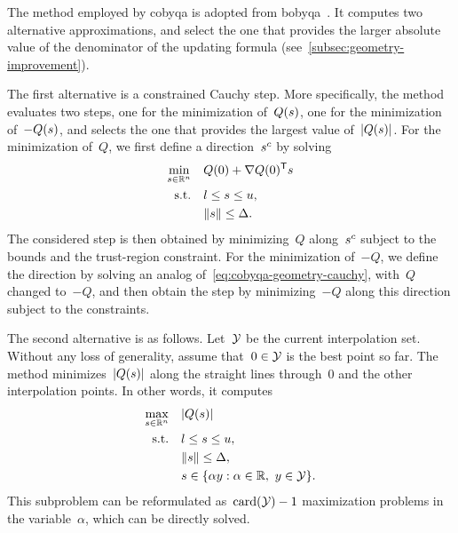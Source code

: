 The method employed by \gls{cobyqa} is adopted from \gls{bobyqa}~\cite{Powell_2009}.
It computes two alternative approximations, and select the one that provides the larger absolute value of the denominator of the updating formula (see~\cref{subsec:geometry-improvement}).

The first alternative is a constrained Cauchy step.
More specifically, the method evaluates two steps, one for the minimization of~$Q(\sstep)$, one for the minimization of~$-Q(\sstep)$, and selects the one that provides the largest value of~$\abs{Q(\sstep)}$.
For the minimization of~$Q$, we first define a direction~$\sstep[c]$ by solving
\begin{subequations}
    \label{eq:cobyqa-geometry-cauchy}
    \begin{align}
        \min_{\sstep \in \R^n}  & \quad Q(0) + \nabla Q(0)^{\T} \sstep\\
        \text{s.t.}             & \quad \xl \le \sstep \le \xu,\\
                                & \quad \norm{\sstep} \le \rad.
    \end{align}
\end{subequations}
The considered step is then obtained by minimizing~$Q$ along~$\sstep[c]$ subject to the bounds and the trust-region constraint.
For the minimization of~$-Q$, we define the direction by solving an analog of~\cref{eq:cobyqa-geometry-cauchy}, with~$Q$ changed to~$-Q$, and then obtain the step by minimizing~$-Q$ along this direction subject to the constraints.

The second alternative is as follows.
Let~$\xpt$ be the current interpolation set.
Without any loss of generality, assume that~$0 \in \xpt$ is the best point so far.
The method minimizes~$\abs{Q(\sstep)}$ along the straight lines through~$0$ and the other interpolation points.
In other words, it computes
\begin{align*}
    \max_{\sstep \in \R^n}  & \quad \abs{Q(\sstep)}\\
    \text{s.t.}             & \quad \xl \le \sstep \le \xu,\\
                            & \quad \norm{\sstep} \le \rad,\\
                            & \quad \sstep \in \set{\alpha y : \alpha \in \R, ~ y \in \xpt}.
\end{align*}
This subproblem can be reformulated as~$\card(\xpt) - 1$ maximization problems in the variable~$\alpha$, which can be directly solved.

